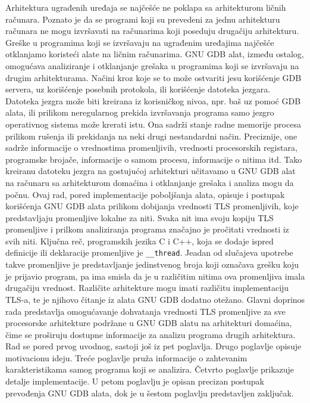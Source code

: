\documentclass[12pt,oneside]{memoir}
\begin{document}
Arhitektura ugrađenih uređaja se najčešće ne poklapa sa arhitekturom ličnih računara. Poznato je da se programi koji su prevedeni za jednu arhitekturu računara ne mogu izvršavati na računarima koji poseduju drugačiju arhitekturu. Greške u programima koji se izvršavaju na ugrađenim uređajima najčešće otklanjamo koristeći alate na ličnim računarima. GNU GDB alat, između ostalog, omogućava analiziranje i otklanjanje grešaka u programima koji se izvršavaju na drugim arhitekturama. Načini kroz koje se to može ostvariti jesu korišćenje GDB servera, uz korišćenje posebnih protokola, ili korišćenje datoteka jezgara.
Datoteka jezgra može biti kreirana iz korisničkog nivoa, npr. baš uz pomoć GDB alata, ili prilikom neregularnog prekida izvršavanja programa samo jezgro operativnog sistema može krerati istu. Ona sadrži stanje radne memorije procesa prilikom rušenja ili prekidanja na neki drugi nestandardni način. Preciznije, one sadrže informacije o vrednostima promenljivih, vrednosti procesorskih registara, programske brojače, informacije o samom procesu, informacije o nitima itd. Tako kreiranu datoteku jezgra na gostujućoj arhitekturi učitavamo u GNU GDB alat na računaru sa arhitekturom domaćina i otklanjanje grešaka i analiza mogu da počnu.
Ovaj rad, pored implementacije poboljšanja alata, opisuje i postupak korišćenja GNU GDB alata prilikom dobijanja vrednosti TLS promenljivih, koje predstavljaju promenljive lokalne za niti. Svaka nit ima svoju kopiju TLS promenljive i prilkom analiziranja programa značajno je pročitati vrednosti iz svih niti. Ključna reč, programskih jezika C i C++, koja se dodaje ispred definicije ili deklaracije promenljive je \texttt{\_\_thread}. Jeadan od slučajeva upotrebe takve promenljive je predstavljanje jedinstvenog broja koji označava grešku koju je prijavio program, pa ima smisla da je u različitim nitima ova promenljiva imala drugačiju vrednost. Različite arhitekture mogu imati različitu implementaciju TLS-a, te je njihovo čitanje iz alata GNU GDB dodatno otežano.
Glavni doprinos rada predstavlja omogućavanje dohvatanja vrednosti TLS promenljive za sve procesorske arhitekture podržane u GNU GDB alatu na arhitekturi domaćina, čime se proširuju dostupne informacije za analizu programa drugih arhitektura.
Rad se pored prvog uvodnog, sastoji još iz pet poglavlja. Drugo poglavlje opisuje motivacionu ideju. Treće poglavlje pruža informacije o zahtevanim karakteristikama samog programa koji se analizira. Četvrto poglavlje prikazuje detalje implementacije. U petom poglavlju je opisan precizan postupak prevođenja GNU GDB alata, dok je u šestom poglavlju predstavljen zaključak.
\end{document}
